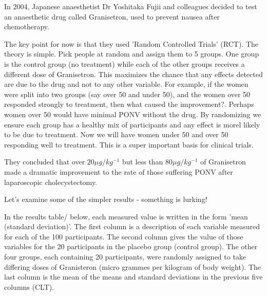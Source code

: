 \documentclass[a4paper,twosided,notoc]{tufte-book}
\begin{document}
In 2004, Japanese anaesthetist Dr Yoshitaka Fujii and colleagues decided to test an anaesthetic drug called Granisetron, used to prevent nausea after chemotherapy. 

The key point for now is that they used 'Random Controlled Trials' (RCT). The theory is simple. Pick people at random and assign them to 5 groups. One group is the control group (no treatment) while each of the other groups receives a different dose of Granisetron. This maximizes the chance that any effects detected are due to the drug and not to any other variable. For example, if the women were split into two groups (say over 50 and under 50), and the women over 50 responded strongly to treatment, then what caused the improvement?. Perhaps women over 50 would have minimal PONV without the drug. By randomizing we ensure each group has a healthy mix of participants and any effect is morel likely to be due to treatment. Now we will have women under 50 and over 50 responding well to treatment. This is a super important basis for clinical trials.

They concluded that over $20\mu g/kg^{-1}$ but less than $80\mu g/kg^{-1}$ of Granisetron made a dramatic improvement to the rate of those suffering PONV after laparoscopic cholecystectomy.

Let's examine some of the simpler results - something is lurking!

In the results table/ below, each measured value is written in the form 'mean (standard deviation)'. The first column is a description of each variable measured for each of the 100 participants. The second column gives the value of those variables for the 20 participants in the placebo group (control group). The other four groups, each containing 20 participants, were randomly assigned to take differing doses of Granisteron (micro grammes per kilogram of body weight). The last column is the mean of the means and standard deviations in the previous five columns (CLT).
\end{document}
